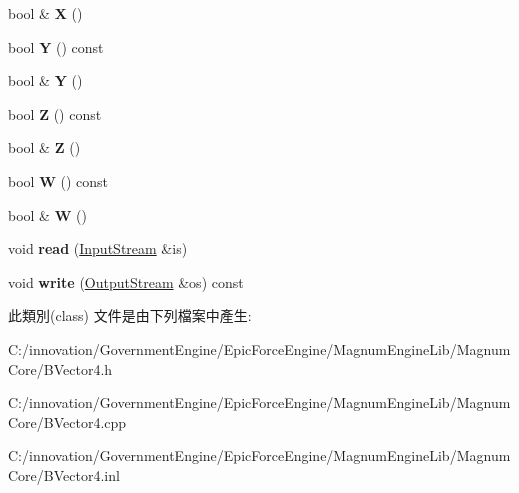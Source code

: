 \begin{DoxyCompactItemize}
\item 
bool \& {\bfseries X} ()\hypertarget{class_i_dream_sky_1_1_b_vector4_af6cf0a2f9c096e33cd46d64a4a4e5437}{}\label{class_i_dream_sky_1_1_b_vector4_af6cf0a2f9c096e33cd46d64a4a4e5437}

\item 
bool {\bfseries Y} () const \hypertarget{class_i_dream_sky_1_1_b_vector4_ac0272c9e5f8c8e25b82bc7c0b08d6ab5}{}\label{class_i_dream_sky_1_1_b_vector4_ac0272c9e5f8c8e25b82bc7c0b08d6ab5}

\item 
bool \& {\bfseries Y} ()\hypertarget{class_i_dream_sky_1_1_b_vector4_a5b43636222ccb3089591c1a7c5fc40de}{}\label{class_i_dream_sky_1_1_b_vector4_a5b43636222ccb3089591c1a7c5fc40de}

\item 
bool {\bfseries Z} () const \hypertarget{class_i_dream_sky_1_1_b_vector4_ad087e0eafb09451799bb1e415105b2c9}{}\label{class_i_dream_sky_1_1_b_vector4_ad087e0eafb09451799bb1e415105b2c9}

\item 
bool \& {\bfseries Z} ()\hypertarget{class_i_dream_sky_1_1_b_vector4_a22fab4e2813d4c2c9cb18fa089e93169}{}\label{class_i_dream_sky_1_1_b_vector4_a22fab4e2813d4c2c9cb18fa089e93169}

\item 
bool {\bfseries W} () const \hypertarget{class_i_dream_sky_1_1_b_vector4_a49a17b814de57f9cee1cd0137ba62b21}{}\label{class_i_dream_sky_1_1_b_vector4_a49a17b814de57f9cee1cd0137ba62b21}

\item 
bool \& {\bfseries W} ()\hypertarget{class_i_dream_sky_1_1_b_vector4_a04ee3ddd6aa03274036b9639f3012a66}{}\label{class_i_dream_sky_1_1_b_vector4_a04ee3ddd6aa03274036b9639f3012a66}

\item 
void {\bfseries read} (\hyperlink{class_i_dream_sky_1_1_input_stream}{Input\+Stream} \&is)\hypertarget{class_i_dream_sky_1_1_b_vector4_a29b81ee962fe4f977277cdede21adfe2}{}\label{class_i_dream_sky_1_1_b_vector4_a29b81ee962fe4f977277cdede21adfe2}

\item 
void {\bfseries write} (\hyperlink{class_i_dream_sky_1_1_output_stream}{Output\+Stream} \&os) const \hypertarget{class_i_dream_sky_1_1_b_vector4_a159a00a6762ee6edff35d0f037621161}{}\label{class_i_dream_sky_1_1_b_vector4_a159a00a6762ee6edff35d0f037621161}

\end{DoxyCompactItemize}


此類別(class) 文件是由下列檔案中產生\+:\begin{DoxyCompactItemize}
\item 
C\+:/innovation/\+Government\+Engine/\+Epic\+Force\+Engine/\+Magnum\+Engine\+Lib/\+Magnum\+Core/B\+Vector4.\+h\item 
C\+:/innovation/\+Government\+Engine/\+Epic\+Force\+Engine/\+Magnum\+Engine\+Lib/\+Magnum\+Core/B\+Vector4.\+cpp\item 
C\+:/innovation/\+Government\+Engine/\+Epic\+Force\+Engine/\+Magnum\+Engine\+Lib/\+Magnum\+Core/B\+Vector4.\+inl\end{DoxyCompactItemize}
